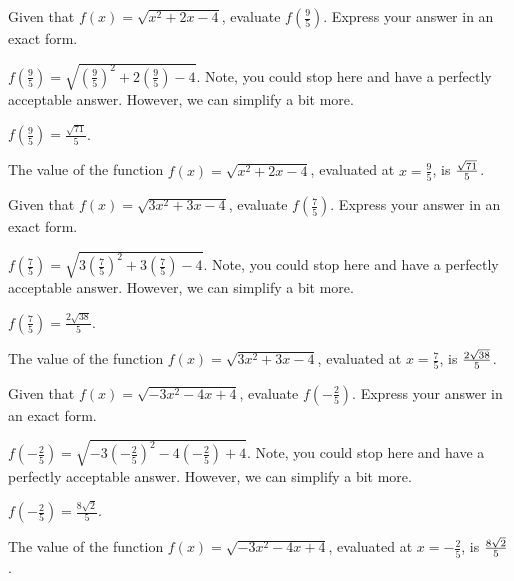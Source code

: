 \begin{shuffle}
\begin{exercise}
Given that $f(x)=\sqrt{x^2+2 x-4}$, evaluate $f\left(\frac{9}{5}\right)$. Express your answer in an exact form.
\begin{solution}
\begin{hint}
$f\left(\frac{9}{5}\right)=\sqrt{(\frac{9}{5})^2+2 (\frac{9}{5})-4}$. Note, you could stop here and have a perfectly acceptable answer. However, we can simplify a bit more. 
\end{hint}
\begin{hint}
$f\left(\frac{9}{5}\right)=\frac{\sqrt{71}}{5}$.
\end{hint}
The value of the function $f(x) = \sqrt{x^2+2 x-4}$, evaluated at $x=\frac{9}{5}$, is ${\frac{\sqrt{71}}{5}}$.
\end{solution}
\end{exercise}

\begin{exercise}
Given that $f(x)=\sqrt{3 x^2+3 x-4}$, evaluate $f\left(\frac{7}{5}\right)$. Express your answer in an exact form.
\begin{solution}
\begin{hint}
$f\left(\frac{7}{5}\right)=\sqrt{3 (\frac{7}{5})^2+3 (\frac{7}{5})-4}$. Note, you could stop here and have a perfectly acceptable answer. However, we can simplify a bit more. 
\end{hint}
\begin{hint}
$f\left(\frac{7}{5}\right)=\frac{2 \sqrt{38}}{5}$.
\end{hint}
The value of the function $f(x) = \sqrt{3 x^2+3 x-4}$, evaluated at $x=\frac{7}{5}$, is ${\frac{2 \sqrt{38}}{5}}$.
\end{solution}
\end{exercise}

\begin{exercise}
Given that $f(x)=\sqrt{-3 x^2-4 x+4}$, evaluate $f\left(-\frac{2}{5}\right)$. Express your answer in an exact form.
\begin{solution}
\begin{hint}
$f\left(-\frac{2}{5}\right)=\sqrt{-3 (-\frac{2}{5})^2-4 (-\frac{2}{5})+4}$. Note, you could stop here and have a perfectly acceptable answer. However, we can simplify a bit more. 
\end{hint}
\begin{hint}
$f\left(-\frac{2}{5}\right)=\frac{8 \sqrt{2}}{5}$.
\end{hint}
The value of the function $f(x) = \sqrt{-3 x^2-4 x+4}$, evaluated at $x=-\frac{2}{5}$, is ${\frac{8 \sqrt{2}}{5}}$.
\end{solution}
\end{exercise}


\end{shuffle}
